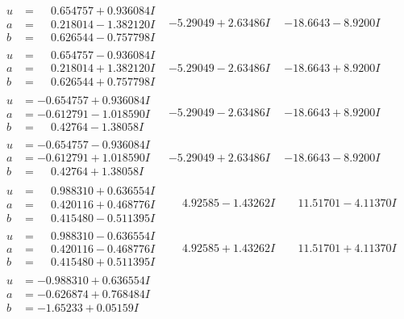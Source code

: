 \documentclass[1p]{elsarticle_modified}
\theoremstyle{definition}
\begin{document}
$$\begin{array}{c|c|c}
\begin{aligned}
u &= \phantom{-}0.654757 + 0.936084 I \\
a &= \phantom{-}0.218014 - 1.382120 I \\
b &= \phantom{-}0.626544 - 0.757798 I\end{aligned}
 & -5.29049 + 2.63486 I & -18.6643 - 8.9200 I \\ \hline\begin{aligned}
u &= \phantom{-}0.654757 - 0.936084 I \\
a &= \phantom{-}0.218014 + 1.382120 I \\
b &= \phantom{-}0.626544 + 0.757798 I\end{aligned}
 & -5.29049 - 2.63486 I & -18.6643 + 8.9200 I \\ \hline\begin{aligned}
u &= -0.654757 + 0.936084 I \\
a &= -0.612791 - 1.018590 I \\
b &= \phantom{-}0.42764 - 1.38058 I\end{aligned}
 & -5.29049 - 2.63486 I & -18.6643 + 8.9200 I \\ \hline\begin{aligned}
u &= -0.654757 - 0.936084 I \\
a &= -0.612791 + 1.018590 I \\
b &= \phantom{-}0.42764 + 1.38058 I\end{aligned}
 & -5.29049 + 2.63486 I & -18.6643 - 8.9200 I \\ \hline\begin{aligned}
u &= \phantom{-}0.988310 + 0.636554 I \\
a &= \phantom{-}0.420116 + 0.468776 I \\
b &= \phantom{-}0.415480 - 0.511395 I\end{aligned}
 & \phantom{-}4.92585 - 1.43262 I & \phantom{-}11.51701 - 4.11370 I \\ \hline\begin{aligned}
u &= \phantom{-}0.988310 - 0.636554 I \\
a &= \phantom{-}0.420116 - 0.468776 I \\
b &= \phantom{-}0.415480 + 0.511395 I\end{aligned}
 & \phantom{-}4.92585 + 1.43262 I & \phantom{-}11.51701 + 4.11370 I \\ \hline\begin{aligned}
u &= -0.988310 + 0.636554 I \\
a &= -0.626874 + 0.768484 I \\
b &= -1.65233 + 0.05159 I\end{aligned}

\end{array}$$
\end{document}
